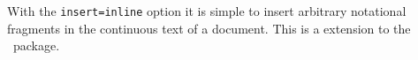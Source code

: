 \documentclass{scrartcl}
\begin{document}
With the \texttt{insert=inline} option it is simple to insert arbitrary
notational fragments in the
continuous text of a document.
This is a  extension to the \lilyglyphs\ package.
\end{document}
